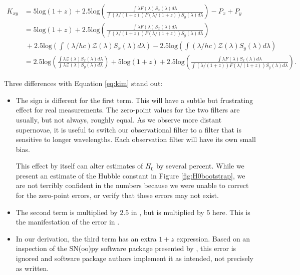 \documentclass[linenumbers]{aastex631}
\begin{document}
\begin{equation}
\begin{aligned}
  K_{xy} &= 5 \text{log} (1 + z)
            + 2.5 \text{log} \left(
              \frac{\int \lambda F(\lambda) S_x(\lambda) d\lambda}
                   {\int (\lambda / (1+z)) F(\lambda / (1+z)) S_y(\lambda) d\lambda} \right)
            - P_x + P_y \\
         &= 5 \text{log} (1 + z)
            + 2.5 \text{log} \left(
              \frac{\int \lambda F(\lambda) S_x(\lambda) d\lambda}
                   {\int (\lambda / (1+z)) F(\lambda / (1+z)) S_y(\lambda) d\lambda} \right) \\ &\
            + 2.5 \text{log} \left( \int (\lambda / hc) \mathcal{Z}(\lambda) S_x(\lambda) d\lambda \right)
            - 2.5 \text{log} \left( \int (\lambda / hc) \mathcal{Z}(\lambda) S_y(\lambda) d\lambda \right) \\
         &= 2.5 \text{log} \left(
              \frac{\int \lambda \mathcal{Z}(\lambda) S_x(\lambda) d\lambda}
                   {\int \lambda \mathcal{Z}(\lambda) S_y(\lambda) d\lambda}
             \right)
            + 5 \text{log} (1 + z)
            + 2.5 \text{log} \left(
              \frac{\int \lambda F(\lambda) S_x(\lambda) d\lambda}
                   {\int (\lambda / (1+z)) F(\lambda / (1+z)) S_y(\lambda) d\lambda} \right) .
\end{aligned}
\end{equation}

Three differences with Equation \ref{eq:kim} stand out:

\begin{itemize}
  \item The sign is different for the first term. This will have a subtle but
  frustrating effect for real measurements. The zero-point values for the two
  filters are usually, but not always, roughly equal. As we observe more
  distant supernovae, it is useful to switch our observational filter to a
  filter that is sensitive to longer wavelengths. Each observation filter will
  have its own small bias.

  This effect by itself can alter estimates of $H_0$ by several percent. While
  we present an estimate of the Hubble constant in Figure
  \ref{fig:H0bootstrap}, we are not terribly confident in the numbers because
  we were unable to correct for the zero-point errors, or verify that these
  errors may not exist.

  \item The second term is multiplied by $2.5$ in \citet{kim1996}, but is
  multiplied by $5$ here. This is the manifestation of the error in
  \citet{tolman1930}.

  \item In our derivation, the third term has an extra $1 + z$ expression.
  Based on an inspection of the SN(oo)py software package presented by
  \citet{snpy}, this error is ignored and software package authors implement it
  as intended, not precisely as written.
\end{itemize}
\end{document}
